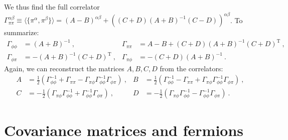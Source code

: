 \documentclass[letter]{article}
\begin{document}
We thus find the full correlator $\Gamma^{\alpha\beta}_{\pi\pi} \equiv \langle \{ \pi^\alpha, \pi^\beta \} \rangle = (A - B)^{\alpha\beta} + ( (C+D)(A+B)^{-1}(C-D))^{\alpha\beta}$. To summarize:
\begin{align}
\Gamma_{\phi\phi} &= (A+B)^{-1}\ , & \Gamma_{\pi\pi} &= A-B + (C+D) (A+B)^{-1} (C+D)^\mathrm{T}\ , \nonumber\\
\Gamma_{\phi\pi} &= -(A+B)^{-1} (C+D)^\mathrm{T}\ , & \Gamma_{\pi\phi} &= - (C+D) (A+B)^{-1}\ .
\end{align}
Again, we can reconstruct the matrices $A,B,C,D$ from the correlators:
\begin{align}
A &= \frac{1}{2} \left( \Gamma_{\phi\phi}^{-1} + \Gamma_{\pi\pi} - \Gamma_{\pi\phi} \Gamma_{\phi\phi}^{-1} \Gamma_{\phi\pi} \right)\ , &
B &= \frac{1}{2} \left(  \Gamma_{\phi\phi}^{-1} - \Gamma_{\pi\pi} + \Gamma_{\pi\phi} \Gamma_{\phi\phi}^{-1} \Gamma_{\phi\pi}  \right)\ ,\nonumber\\
C &= -\frac{1}{2} \left( \Gamma_{\pi\phi} \Gamma_{\phi\phi}^{-1} + \Gamma_{\phi\phi}^{-1} \Gamma_{\phi\pi} \right)\ , &
D &=  -\frac{1}{2} \left( \Gamma_{\pi\phi} \Gamma_{\phi\phi}^{-1} - \Gamma_{\phi\phi}^{-1} \Gamma_{\phi\pi} \right)\ .
\end{align}

\section{Covariance matrices and fermions}
\end{document}
